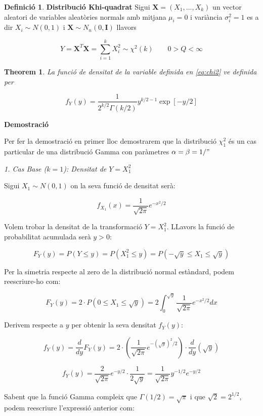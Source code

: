 \documentclass[
  catalan,
]{article}
\newtheorem{theorem}{Theorem}[section]
\theoremstyle{definition}
\newtheorem{definition}{Definició}[section]
\theoremstyle{definition}
\theoremstyle{definition}
\theoremstyle{definition}
\theoremstyle{remark}
\begin{document}
\begin{definition}
\textbf{Distribució Khi-quadrat}
Sigui \(\mathbf{X}=(X_1,...,X_k)\) un vector aleatori de variables aleatòries normals amb mitjana \(\mu_i=0\) i variància \(\sigma_i^2=1\) es a dir \(X_i \sim N(0,1)\) i \(\mathbf{X} \sim N_n(0,\mathbf{I})\) llavors

\[
Y=\mathbf{X}^T \mathbf{X}= \sum_{i=1}^k  X_i^2 \sim \chi^2(k) \qquad  0>Q<\infty  \label{eq:chi2}
\]
\end{definition}

\begin{theorem}
La funció de densitat de la variable definida en \eqref{eq:chi2} ve definida per

\[
f_Y(y) = \frac{1}{2^{k/2} \Gamma(k/2)} y^{k/2 - 1} \exp[-y/2]    \label{eq:denschi2}
\]
\end{theorem}

\textbf{Demostració}

Per fer la demostració en primer lloc demostrarem que la distribució \(\chi_1^2\) és un cas particular de una distribució Gamma con paràmetres \(\alpha=\beta=1/"\)

\emph{1. Cas Base (\(k=1\)): Densitat de \(Y = X_1^2\)}

Sigui \(X_1 \sim N(0,1)\) on la seva funció de densitat serà:

\[f_{X_1}(x) = \frac{1}{\sqrt{2\pi}} e^{-x^2/2}\]

Volem trobar la densitat de la transformació \(Y = X_1^2\). LLavors la funció de probabilitat acumulada serà \(y > 0\):

\[F_Y(y) = P(Y \le y) = P(X_1^2 \le y) = P(-\sqrt{y} \le X_1 \le \sqrt{y})\]

Per la simetria respecte al zero de la distribució normal estàndard, podem reescriure-ho com:

\[F_Y(y) = 2 \cdot P(0 \le X_1 \le \sqrt{y}) = 2 \int_{0}^{\sqrt{y}} \frac{1}{\sqrt{2\pi}} e^{-x^2/2} dx\]

Derivem respecte a \(y\) per obtenir la seva densitat \(f_Y(y)\):

\[f_Y(y) = \frac{d}{dy} F_Y(y) = 2 \cdot \left( \frac{1}{\sqrt{2\pi}} e^{-(\sqrt{y})^2/2} \right) \cdot \frac{d}{dy}(\sqrt{y})\]

\[f_Y(y) = \frac{2}{\sqrt{2\pi}} e^{-y/2} \cdot \frac{1}{2\sqrt{y}} = \frac{1}{\sqrt{2\pi}} y^{-1/2} e^{-y/2}\]

Sabent que la funció Gamma compleix que \(\Gamma(1/2) = \sqrt{\pi}\) i que \(\sqrt{2} = 2^{1/2}\), podem reescriure l'expressió anterior com:
\end{document}
